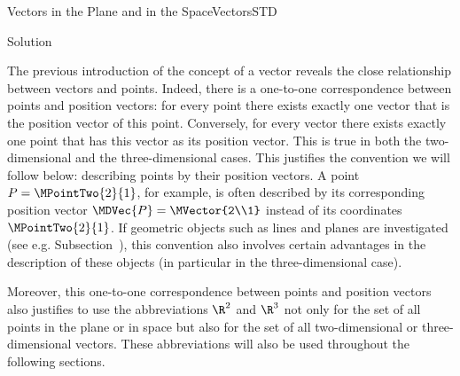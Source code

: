 \begin{MXContent}{Vectors in the Plane and in the Space}{Vectors}{STD}
\begin{MExercise}
\begin{MHint}{Solution}
\begin{itemize}
\begin{center}
\end{center}

\end{itemize}

\end{MHint}

\end{MExercise}

The previous introduction of the concept of a vector reveals the close relationship between vectors and points. Indeed, there 
is a one-to-one correspondence between points and position vectors: for every point there exists exactly one vector that is the position vector
of this point. Conversely, for every vector there exists exactly one point that has this vector as its position vector. 
This is true in both the two-dimensional and the three-dimensional cases. This justifies the convention we will follow below: 
describing points by their position vectors. A point $P=\MPointTwo{2}{1}$, for example, is often described by its corresponding 
position vector $\MDVec{P}=\MVector{2\\1}$ instead of its coordinates $\MPointTwo{2}{1}$. If geometric objects such as lines 
and planes are investigated (see e.g. Subsection~), this convention also involves certain 
advantages in the description of these objects (in particular in the three-dimensional case).

Moreover, this one-to-one correspondence between points and position vectors also justifies to use the abbreviations 
$\R^2$ and $\R^3$ not only for the set of all points in the plane or in space but also for the set of all 
two-dimensional or three-dimensional vectors. These abbreviations will also be used throughout the following sections.

\end{MXContent}

